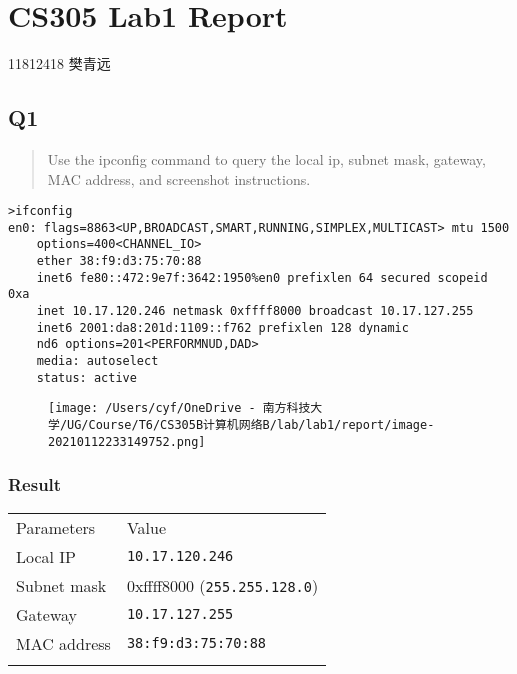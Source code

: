 \documentclass[
]{article}
\author{}
\date{}
\begin{document}
\hypertarget{header-n0}{%
\section{CS305 Lab1 Report}\label{header-n0}}

11812418 樊青远

\hypertarget{header-n3}{%
\subsection{Q1}\label{header-n3}}

\begin{quote}
Use the ipconfig command to query the local ip, subnet mask, gateway,
MAC address, and screenshot instructions.
\end{quote}

\begin{verbatim}
>ifconfig
en0: flags=8863<UP,BROADCAST,SMART,RUNNING,SIMPLEX,MULTICAST> mtu 1500
	options=400<CHANNEL_IO>
	ether 38:f9:d3:75:70:88 
	inet6 fe80::472:9e7f:3642:1950%en0 prefixlen 64 secured scopeid 0xa 
	inet 10.17.120.246 netmask 0xffff8000 broadcast 10.17.127.255
	inet6 2001:da8:201d:1109::f762 prefixlen 128 dynamic 
	nd6 options=201<PERFORMNUD,DAD>
	media: autoselect
	status: active
\end{verbatim}

\begin{figure}
\centering
\texttt{[image: /Users/cyf/OneDrive - 南方科技大学/UG/Course/T6/CS305B计算机网络B/lab/lab1/report/image-20210112233149752.png]}
\caption{}
\end{figure}

\hypertarget{header-n8}{%
\subsubsection{Result}\label{header-n8}}

\begin{longtable}[]{@{}ll@{}}
\toprule
Parameters & Value \\ \addlinespace
\midrule
\endhead
Local IP & \texttt{10.17.120.246} \\ \addlinespace
Subnet mask & 0xffff8000 (\texttt{255.255.128.0}) \\ \addlinespace
Gateway & \texttt{10.17.127.255} \\ \addlinespace
MAC address & \texttt{38:f9:d3:75:70:88} \\ \addlinespace
\bottomrule
\end{longtable}
\end{document}

